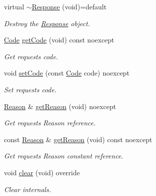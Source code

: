 \begin{DoxyCompactItemize}
\item 
virtual \mbox{\hyperlink{classo_z_1_1_h_t_t_p_1_1_response_a0dd4953fa89d6f7c8fbe6fdc6a9ca50e}{$\sim$\+Response}} (void)=default
\begin{DoxyCompactList}\small\item\em Destroy the \mbox{\hyperlink{classo_z_1_1_h_t_t_p_1_1_response}{Response}} object. \end{DoxyCompactList}\item 
\mbox{\hyperlink{namespaceo_z_1_1_h_t_t_p_acd43703151305f79b1e2f42e98ee8199}{Code}} \mbox{\hyperlink{classo_z_1_1_h_t_t_p_1_1_response_aa2191a167fe53e8f0a8c2e64393cede0}{get\+Code}} (void) const noexcept
\begin{DoxyCompactList}\small\item\em Get request\textquotesingle{}s code. \end{DoxyCompactList}\item 
void \mbox{\hyperlink{classo_z_1_1_h_t_t_p_1_1_response_a37a97a943ebded8fca87ee14cd76c0fa}{set\+Code}} (const \mbox{\hyperlink{namespaceo_z_1_1_h_t_t_p_acd43703151305f79b1e2f42e98ee8199}{Code}} code) noexcept
\begin{DoxyCompactList}\small\item\em Set request\textquotesingle{}s code. \end{DoxyCompactList}\item 
\mbox{\hyperlink{namespaceo_z_1_1_h_t_t_p_afcd8b91e5e8a7b6df0a7b3b298ec3965}{Reason}} \& \mbox{\hyperlink{classo_z_1_1_h_t_t_p_1_1_response_a72ccc6e4aa64f1bf2c54218436631a26}{get\+Reason}} (void) noexcept
\begin{DoxyCompactList}\small\item\em Get request\textquotesingle{}s Reason reference. \end{DoxyCompactList}\item 
const \mbox{\hyperlink{namespaceo_z_1_1_h_t_t_p_afcd8b91e5e8a7b6df0a7b3b298ec3965}{Reason}} \& \mbox{\hyperlink{classo_z_1_1_h_t_t_p_1_1_response_a9b05303e7b76a04d3ab4ed8960de130c}{get\+Reason}} (void) const noexcept
\begin{DoxyCompactList}\small\item\em Get request\textquotesingle{}s Reason constant reference. \end{DoxyCompactList}\item 
void \mbox{\hyperlink{classo_z_1_1_h_t_t_p_1_1_response_a2bce180e3288f0bd78a9fbc2a74b608c}{clear}} (void) override
\begin{DoxyCompactList}\small\item\em Clear internals. \end{DoxyCompactList}\end{DoxyCompactItemize}


